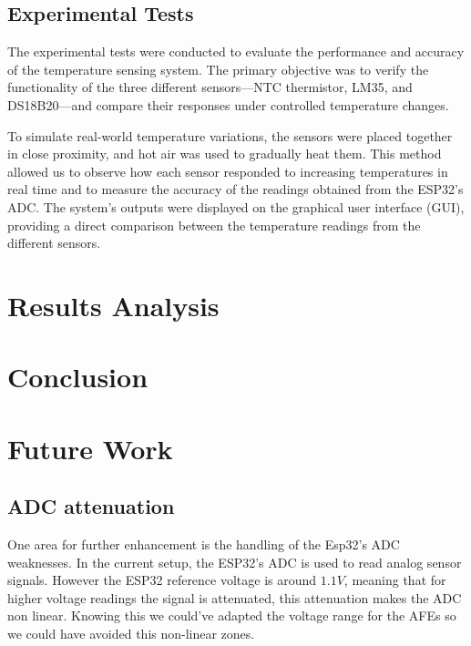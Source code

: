 \documentclass[12pt]{article}
\begin{document}
\subsection{Experimental Tests}

    The experimental tests were conducted to evaluate the performance and accuracy of the temperature sensing system. The primary objective was to verify the functionality of the three different sensors—NTC thermistor, LM35, and DS18B20—and compare their responses under controlled temperature changes.

    To simulate real-world temperature variations, the sensors were placed together in close proximity, and hot air was used to gradually heat them. This method allowed us to observe how each sensor responded to increasing temperatures in real time and to measure the accuracy of the readings obtained from the ESP32's ADC. The system's outputs were displayed on the graphical user interface (GUI), providing a direct comparison between the temperature readings from the different sensors.



\section{Results Analysis}

\section{Conclusion}

\section{Future Work}
\subsection{ADC attenuation }

One area for further enhancement is the handling of the Esp32's ADC weaknesses. In the current setup, the ESP32's ADC is used to read analog sensor signals. However the ESP32 reference voltage is around $1.1V$, meaning that for higher voltage readings the signal is attenuated, this attenuation makes the ADC non linear. 
Knowing this we could've adapted the voltage range for the AFEs so we could have avoided this non-linear zones. 
\end{document}
